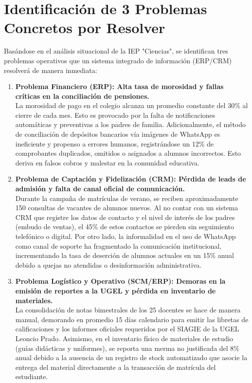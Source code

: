 \documentclass[12pt,a4paper,oneside]{report}
\begin{document}
\newpage

\section{Identificación de 3 Problemas Concretos por Resolver}

Basándose en el análisis situacional de la IEP "Ciencias", se identifican tres problemas operativos que un sistema integrado de información (ERP/CRM) resolverá de manera inmediata:

\begin{enumerate}
    \item \textbf{Problema Financiero (ERP): Alta tasa de morosidad y fallas críticas en la conciliación de pensiones.} \\
    La morosidad de pago en el colegio alcanza un promedio constante del 30\% al cierre de cada mes. Esto es provocado por la falta de notificaciones automáticas y preventivas a los padres de familia. Adicionalmente, el método de conciliación de depósitos bancarios vía imágenes de WhatsApp es ineficiente y propenso a errores humanos, registrándose un 12\% de comprobantes duplicados, omitidos o asignados a alumnos incorrectos. Esto deriva en falsos cobros y malestar en la comunidad educativa.
    
    \item \textbf{Problema de Captación y Fidelización (CRM): Pérdida de leads de admisión y falta de canal oficial de comunicación.} \\
    Durante la campaña de matrículas de verano, se reciben aproximadamente 150 consultas de vacantes de alumnos nuevos. Al no contar con un sistema CRM que registre los datos de contacto y el nivel de interés de los padres (embudo de ventas), el 45\% de estos contactos se pierden sin seguimiento telefónico o digital. Por otro lado, la informalidad en el uso de WhatsApp como canal de soporte ha fragmentado la comunicación institucional, incrementando la tasa de deserción de alumnos actuales en un 15\% anual debido a quejas no atendidas o desinformación administrativa.
    
    \item \textbf{Problema Logístico y Operativo (SCM/ERP): Demoras en la emisión de reportes a la UGEL y pérdida en inventario de materiales.} \\
    La consolidación de notas bimestrales de los 25 docentes se hace de manera manual, demorando en promedio 15 días calendario para emitir las libretas de calificaciones y los informes oficiales requeridos por el SIAGIE de la UGEL Leoncio Prado. Asimismo, en el inventario físico de materiales de estudio (guías didácticas y uniformes), se reporta una merma no justificada del 8\% anual debido a la ausencia de un registro de stock automatizado que asocie la entrega del material directamente a la transacción de matrícula del estudiante.
\end{enumerate}
\end{document}
